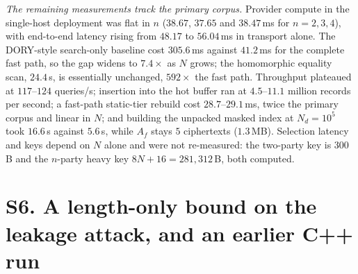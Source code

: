 \documentclass[11pt,a4paper]{article}
\begin{document}
\emph{The remaining measurements track the primary corpus.} Provider compute
in the single-host deployment was flat in $n$ ($38.67$, $37.65$ and
$38.47$\,ms for $n=2,3,4$), with end-to-end latency rising from $48.17$ to
$56.04$\,ms in transport alone. The DORY-style search-only baseline cost
$305.6$\,ms against $41.2$\,ms for the complete fast path, so the gap widens to
$7.4\times$ as $N$ grows; the homomorphic equality scan, $24.4$\,s, is
essentially unchanged, $592\times$ the fast path. Throughput plateaued at
$117$--$124$ queries/s; insertion into the hot buffer ran at $4.5$--$11.1$
million records per second; a fast-path static-tier rebuild cost
$28.7$--$29.1$\,ms, twice the primary corpus and linear in $N$; and building
the unpacked masked index at $N_d=10^5$ took $16.6$\,s against $5.6$\,s, while
$A_f$ stays $5$ ciphertexts ($1.3$\,MB). Selection latency and keys depend on
$N$ alone and were not re-measured: the two-party key is $300$\,B and the
$n$-party heavy key $8N+16=281{,}312$\,B, both computed.

\section*{S6. A length-only bound on the leakage attack, and an earlier C++ run}
\end{document}
